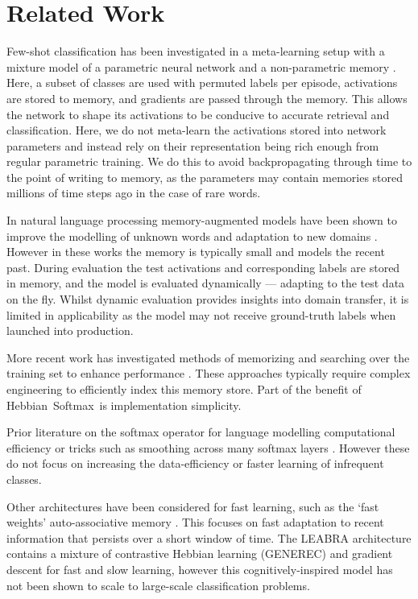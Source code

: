\documentclass{article} \usepackage{hyperref}
\newcommand{\model}{\hbox{Hebbian Softmax }}
\begin{document}
\section{Related Work}
Few-shot classification has been investigated in a meta-learning setup with a mixture model of a parametric neural network and a non-parametric memory \citep{santoro2016one, vinyals2016matching}. Here, a subset of classes are used with permuted labels per episode, activations are stored to memory, and gradients are passed through the memory. This allows the network to shape its activations to be conducive to accurate retrieval and classification. Here, we do not meta-learn the activations stored into network parameters and instead rely on their representation being rich enough from regular parametric training. We do this to avoid backpropagating through time to the point of writing to memory, as the parameters may contain memories stored millions of time steps ago in the case of rare words.

In natural language processing memory-augmented models have been shown to improve the modelling of unknown words and adaptation to new domains \citep{grave2016improving,merity2016pointer,kawakami2017learning}. However in these works the memory is typically small and models the recent past. During evaluation the test activations and corresponding labels are stored in memory, and the model is evaluated dynamically --- adapting to the test data on the fly. Whilst dynamic evaluation provides insights into domain transfer, it is limited in applicability as the model may not receive ground-truth labels when launched into production.

More recent work has investigated methods of memorizing and searching over the training set to enhance performance \citep{kaiser2017learning, grave2017unbounded, gu2017search}. These approaches typically require complex engineering to efficiently index this memory store. Part of the benefit of \model is implementation simplicity.

Prior literature on the softmax operator for language modelling computational efficiency \cite{chen2015strategies,grave2016efficient} or tricks such as smoothing across many softmax layers \cite{yang2017breaking}. However these do not focus on increasing the data-efficiency or faster learning of infrequent classes.

Other architectures have been considered for fast learning, such as the `fast weights' auto-associative memory \citep{ba2016using}. This focuses on fast adaptation to recent information that persists over a short window of time. The LEABRA architecture \citep{o1996leabra} contains a mixture of contrastive Hebbian learning (GENEREC) \citep{o1996biologically} and gradient descent for fast and slow learning, however this cognitively-inspired model has not been shown to scale to large-scale classification problems. 
\end{document}
